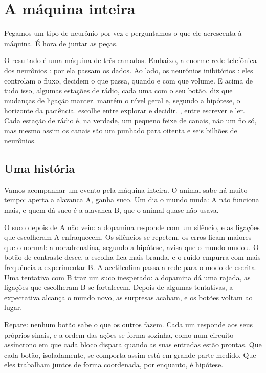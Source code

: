 \chapter{A máquina inteira}


Pegamos um tipo de neurônio por vez e perguntamos o que ele acrescenta à máquina. É hora de juntar as peças.

O resultado é uma máquina de três camadas. Embaixo, a enorme rede telefônica dos neurônios : por ela passam os dados. Ao lado, os neurônios inibitórios : eles controlam o fluxo, decidem o que passa, quando e com que volume. E acima de tudo isso, algumas estações de rádio, cada uma com o seu botão.  diz que mudanças de ligação manter.  mantém o nível geral e, segundo a hipótese, o horizonte da paciência.  escolhe entre explorar e decidir. , entre escrever e ler. Cada estação de rádio é, na verdade, um pequeno feixe de canais, não um fio só, mas mesmo assim os canais são um punhado para oitenta e seis bilhões de neurônios.

\section*{Uma história}

Vamos acompanhar um evento pela máquina inteira. O animal sabe há muito tempo: aperta a alavanca A, ganha suco. Um dia o mundo muda: A não funciona mais, e quem dá suco é a alavanca B, que o animal quase não usava.

O suco depois de A não veio: a dopamina responde com um silêncio, e as ligações que escolheram A enfraquecem. Os silêncios se repetem, os erros ficam maiores que o normal: a noradrenalina, segundo a hipótese, avisa que o mundo mudou. O botão de contraste desce, a escolha fica mais branda, e o ruído empurra com mais frequência a experimentar B. A acetilcolina passa a rede para o modo de escrita. Uma tentativa com B traz um suco inesperado: a dopamina dá uma rajada, as ligações que escolheram B se fortalecem. Depois de algumas tentativas, a expectativa alcança o mundo novo, as surpresas acabam, e os botões voltam ao lugar.

Repare: nenhum botão sabe o que os outros fazem. Cada um responde aos seus próprios sinais, e a ordem das ações se forma sozinha, como num circuito assíncrono em que cada bloco dispara quando as suas entradas estão prontas. Que cada botão, isoladamente, se comporta assim está em grande parte medido. Que eles trabalham juntos de forma coordenada, por enquanto, é hipótese.

